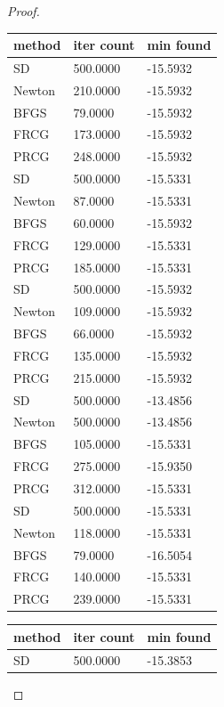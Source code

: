 \documentclass[12pt]{report}
\begin{document}
\begin{problem}
\begin{proof}
    \begin{table}[h!]
        \centering
        \begin{tabular}{l l l}
        method & iter count& min found \\
        \hline
        SD & 500.0000 & -15.5932 \\
        Newton & 210.0000 & -15.5932 \\
        BFGS & 79.0000 & -15.5932 \\
        FRCG & 173.0000 & -15.5932 \\
        PRCG & 248.0000 & -15.5932 \\
        \hline
        SD & 500.0000 & -15.5331 \\
        Newton & 87.0000 & -15.5331 \\
        BFGS & 60.0000 & -15.5932 \\
        FRCG & 129.0000 & -15.5331 \\
        PRCG & 185.0000 & -15.5331 \\
        \hline
        SD & 500.0000 & -15.5932 \\
        Newton & 109.0000 & -15.5932 \\
        BFGS & 66.0000 & -15.5932 \\
        FRCG & 135.0000 & -15.5932 \\
        PRCG & 215.0000 & -15.5932 \\
        \hline
        SD & 500.0000 & -13.4856 \\
        Newton & 500.0000 & -13.4856 \\
        BFGS & 105.0000 & -15.5331 \\
        FRCG & 275.0000 & -15.9350 \\
        PRCG & 312.0000 & -15.5331 \\
        \hline
        SD & 500.0000 & -15.5331 \\
        Newton & 118.0000 & -15.5331 \\
        BFGS & 79.0000 & -16.5054 \\
        FRCG & 140.0000 & -15.5331 \\
        PRCG & 239.0000 & -15.5331 \\
        \hline
        \end{tabular}
        \quad %
        \begin{tabular}{l l l}
        method & iter count& min found \\
        \hline
        SD & 500.0000 & -15.3853 \\

\end{tabular}
\end{table}
\end{proof}
\end{problem}
\end{document}

